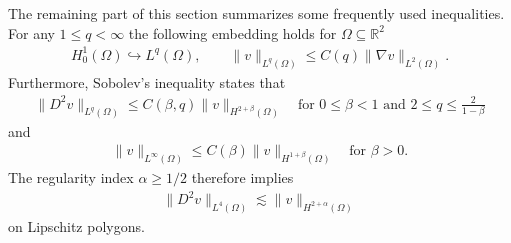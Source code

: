 \documentclass[a4paper]{amsart}
\theoremstyle{definition}
\numberwithin{equation}{section}
\numberwithin{theorem}{section}
\newcommand{\R}{\mathbb{R}}
\begin{document}
The remaining part of this section summarizes some 
frequently used inequalities.
For any $1\leq q <\infty$ the following embedding holds for 
$\Omega\subseteq \R^2$
\begin{align}\label{e:embedding}
    H^1_0(\Omega)\hookrightarrow L^q(\Omega),
    \qquad 
    \lVert v\rVert_{L^q(\Omega)}
    \leq C(q)\lVert \nabla v\rVert_{L^2(\Omega)}.
\end{align}
Furthermore, Sobolev's inequality \cite{AdamsFournier2003} states that
\begin{align}\label{e:sobolev}
    \| D^2 v\|_{L^q(\Omega)}
    \leq C(\beta, q)
    \| v\|_{H^{2+\beta}(\Omega)}
    \quad \text{for }
    0\leq\beta<1 \text{ and } 2\leq q\leq\frac{2}{1-\beta}
\end{align}
and 
\begin{align}\label{e:sobolev_infty}
    \lVert v\rVert_{L^\infty(\Omega)}
    \leq C(\beta) \lVert v\rVert_{H^{1+\beta}(\Omega)}
    \quad \text{for }
    \beta>0.
\end{align}
The regularity index $\alpha\geq 1/2$ therefore implies
\begin{align}\label{e:embedding_L4}
    \| D^2 v\|_{L^4(\Omega)}
    \lesssim
    \| v\|_{H^{2+\alpha}(\Omega)}
\end{align}
on Lipschitz polygons.
\end{document}
